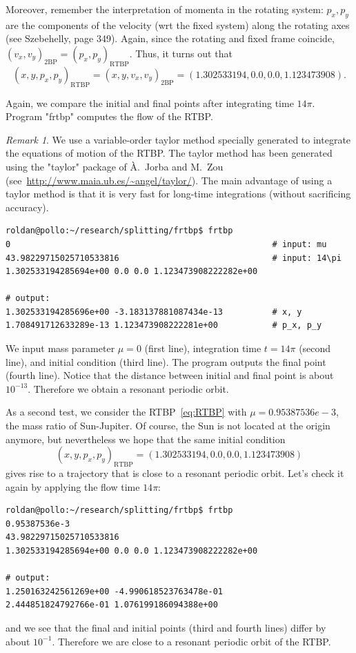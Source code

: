\documentclass[a4paper]{amsart}
\theoremstyle{remark}
\newtheorem{rem}[thm]{Remark}
\begin{document}
Moreover, remember the interpretation of momenta in the rotating system:
$p_x,p_y$ are the components of the velocity (wrt the fixed system) along the
rotating axes (see Szebehelly, page 349). Again, since the rotating and fixed
frame coincide, 
${(v_x,v_y)}_{\mathrm{2BP}}={(p_x,p_y)}_{\mathrm{RTBP}}$.
Thus, it turns out that
\[ {(x,y,p_x,p_y)}_{\mathrm{RTBP}} = {(x,y,v_x,v_y)}_{\mathrm{2BP}} =
(1.302533194, 0.0, 0.0, 1.123473908). \]

Again, we compare the initial and final points after integrating time
$14\pi$. Program "frtbp" computes the flow of the RTBP. 

\begin{rem}
We use a variable-order taylor method specially generated to integrate
the equations of motion of the RTBP. 
The taylor method has been generated using the "taylor" package of \`{A}.~Jorba
and M.~Zou (see~\url{http://www.maia.ub.es/~angel/taylor/}).
The main advantage of using a taylor method is that it is very fast
for long-time integrations (without sacrificing accuracy).
\end{rem}

\begin{verbatim}
roldan@pollo:~/research/splitting/frtbp$ frtbp 
0                                                     # input: mu
43.98229715025710533816                               # input: 14\pi
1.302533194285694e+00 0.0 0.0 1.123473908222282e+00

# output:
1.302533194285696e+00 -3.183137881087434e-13          # x, y
1.708491712633289e-13 1.123473908222281e+00           # p_x, p_y
\end{verbatim}
We input mass parameter $\mu=0$ (first line), integration time $t=14\pi$
(second line), and initial condition (third line). The program outputs the
final point (fourth line). Notice that the distance between initial and final
point is about $10^{-13}$. Therefore we obtain a resonant periodic orbit.

As a second test, we consider the RTBP~\eqref{eq:RTBP} with
$\mu=0.95387536e-3$, the mass ratio of Sun-Jupiter. Of course, the Sun is not
located at the origin anymore, but nevertheless we hope that the same initial
condition
\[ {(x,y,p_x,p_y)}_{\mathrm{RTBP}} = (1.302533194, 0.0, 0.0, 1.123473908) \]
gives rise to a trajectory that is close to a resonant periodic orbit. Let's
check it again by applying the flow time $14\pi$:

\begin{verbatim}
roldan@pollo:~/research/splitting/frtbp$ frtbp 
0.95387536e-3
43.98229715025710533816
1.302533194285694e+00 0.0 0.0 1.123473908222282e+00

# output:
1.250163242561269e+00 -4.990618523763478e-01 
2.444851824792766e-01 1.076199186094388e+00
\end{verbatim}
and we see that the final and initial points (third and fourth lines) differ
by about $10^{-1}$. Therefore we are close to a resonant periodic orbit of
the RTBP.
\end{document}
